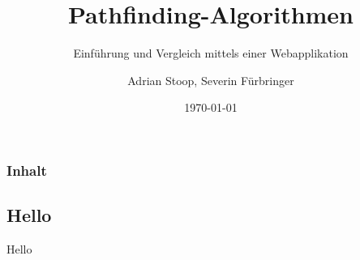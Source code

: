 \documentclass[professionalfont,serif,german]{beamer}
\title[Pathfinder-Vergleicher]{Pathfinding-Algorithmen}
\subtitle{Einführung und Vergleich mittels einer Webapplikation}
\author[A. Stoop, S. Fürbringer]{Adrian Stoop, Severin Fürbringer}
\institute[BMZ, EVT18a]{Berufsmaturitätsschule Zürich}
\date{\today}
\begin{document}
\frame{\titlepage}


\begin{frame}
  \frametitle{Inhalt}
  \tableofcontents
\end{frame}


\begin{frame}
  \section[Abc]{Hello}
  Hello
\end{frame}

\end{document}
